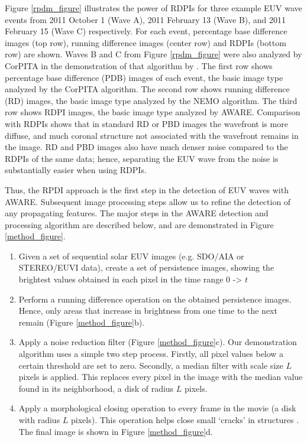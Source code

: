  Figure \ref{rpdm_figure} illustrates the power of RDPIs for three example EUV wave events from 2011 October 1 (Wave A), 2011 February 13 (Wave B), and 2011 February 15 (Wave C) respectively. For each event, percentage base difference images (top row), running difference images (center row) and RDPIs (bottom row) are shown. Waves B and C from Figure \ref{rpdm_figure} were also analyzed by CorPITA in the demonstration of that algorithm by \citet{2014SoPh..289.3279L}.  The first row shows percentage base difference (PDB) images of each event, the basic image type analyzed by the CorPITA algorithm.  The second row shows running difference (RD) images, the basic image type analyzed by the NEMO algorithm.  The third row shows RDPI images, the basic image type analyzed by AWARE. Comparison with RDPIs shows that in standard RD or PBD images the wavefront is more diffuse, and much coronal structure not associated with the wavefront remains in the image. RD and PBD images also have much denser noise compared to the RDPIs of the same data; hence, separating the EUV wave from the noise is substantially easier when using RDPIs.   

Thus, the RPDI approach is the first step in the detection of EUV waves with AWARE. Subsequent image processing steps allow us to refine the detection of any propagating features. The major steps in the AWARE detection and processing algorithm are described below, and are demonstrated in Figure \ref{method_figure}.

\begin{enumerate}

\item Given a set of sequential solar EUV images (e.g. SDO/AIA or STEREO/EUVI data), create a set of persistence images, showing the brightest values obtained in each pixel in the time range 0 -> $t$

\item Perform a running difference operation on the obtained persistence images. Hence, only areas that increase in brightness from one time to the next remain (Figure \ref{method_figure}b).

\item Apply a noise reduction filter (Figure \ref{method_figure}c).  Our demonstration algorithm uses a simple two step process.  Firstly, all pixel values below a certain threshold are set to zero.  Secondly, a median filter with scale size $L$ pixels is applied.  This replaces every pixel in the image with the median value found in its neighborhood, a disk of radius $L$ pixels.

\item Apply a morphological closing \citep{2002dip..book.....G} operation to every frame in the movie (a disk with radius $L$ pixels).  This operation helps close small ‘cracks’ in structures \citep{2002dip..book.....G}.  The final image is shown in Figure \ref{method_figure}d.
\end{enumerate}

